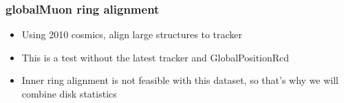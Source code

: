 \documentclass[compress]{beamer}
\begin{document}
\begin{frame}
\frametitle{globalMuon ring alignment}

\begin{itemize}
\item Using 2010 cosmics, align large structures to tracker
\item This is a test without the latest tracker and GlobalPositionRcd
\item Inner ring alignment is not feasible with this dataset, so
  that's why we will combine disk statistics
\end{itemize}

\end{frame}
\end{document}
